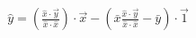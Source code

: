\documentclass[preview]{standalone}
\begin{document}
\begin{align*}
\hat{y} =  ( \frac{\hat{x}\cdot\overrightarrow{y}}{\hat{x}\cdot\hat{x}} ) \cdot \overrightarrow{x} -( \bar{x} \frac{\hat{x}\cdot\overrightarrow{y}}{\hat{x}\cdot\hat{x}} - \bar{y} ) \cdot \overrightarrow{1}
\end{align*}
\end{document}
